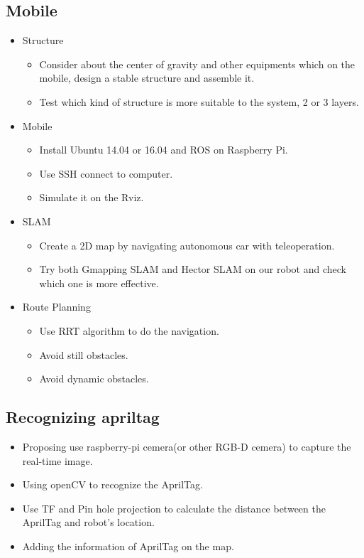 \documentclass[a4paper, 10pt, conference]{ieeeconf}      %
\begin{document}
\subsection{Mobile}
\begin{itemize}
\item Structure
\begin{itemize}
	\item Consider about the center of gravity and other equipments which on the mobile, design a stable structure and assemble it.
	\item Test which kind of structure is more suitable to the system, 2 or 3 layers.
\end{itemize}

\item Mobile
\begin{itemize}
	\item Install Ubuntu 14.04 or 16.04 and ROS on Raspberry Pi.
	\item Use SSH connect to computer.
	\item Simulate it on the Rviz.
\end{itemize}

\item SLAM
\begin{itemize}
	\item Create a 2D map by navigating autonomous car with teleoperation.
	\item Try both Gmapping SLAM and Hector SLAM on our robot and check which one is more effective.
\end{itemize}

\item Route Planning
\begin{itemize}
	\item Use RRT algorithm to do the navigation.
	\item Avoid still obstacles.
	\item Avoid dynamic obstacles.
\end{itemize}
\end{itemize}

\subsection{Recognizing apriltag}
\begin{itemize}
\item Proposing use raspberry-pi cemera(or other RGB-D cemera) to capture the real-time image.
\item Using openCV to recognize the AprilTag.
\item Use TF and Pin hole projection to calculate the distance between the AprilTag and robot's location.
\item Adding the information of AprilTag on the map.
\end{itemize}
\end{document}
